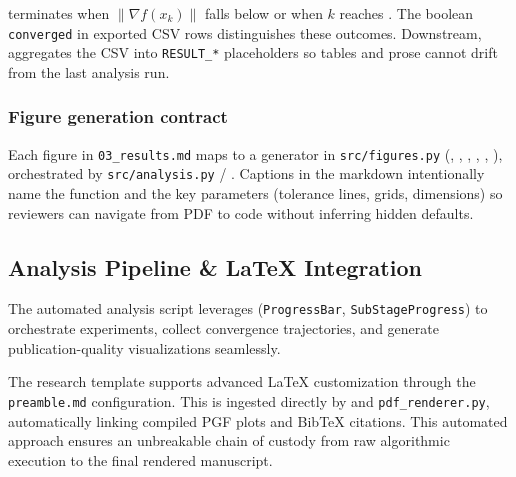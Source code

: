 \documentclass[
]{article}
\begin{document}
 terminates when \(\|\nabla f(x_k)\|\) falls
below  or when \(k\) reaches
. The boolean \texttt{converged} in
exported CSV rows distinguishes these outcomes. Downstream,
 aggregates the
CSV into \texttt{RESULT\_*} placeholders so tables and prose cannot
drift from the last analysis run.

\subsubsection{Figure generation
contract}\label{figure-generation-contract}

Each figure in \texttt{03\_results.md} maps to a generator in
\texttt{src/figures.py} (,
,
,
,
,
), orchestrated by
\texttt{src/analysis.py} / .
Captions in the markdown intentionally name the function and the key
parameters (tolerance lines, grids, dimensions) so reviewers can
navigate from PDF to code without inferring hidden defaults.

\subsection{Analysis Pipeline \& LaTeX
Integration}\label{analysis-pipeline-latex-integration}

The automated analysis script leverages
\href{https://github.com/docxology/template/blob/main/infrastructure/core/progress.py}{}
(\texttt{ProgressBar}, \texttt{SubStageProgress}) to orchestrate
experiments, collect convergence trajectories, and generate
publication-quality visualizations seamlessly.

The research template supports advanced LaTeX customization through the
\texttt{preamble.md} configuration. This is ingested directly by
 and
\texttt{pdf\_renderer.py}, automatically linking compiled PGF plots and
BibTeX citations. This automated approach ensures an unbreakable chain
of custody from raw algorithmic execution to the final rendered
manuscript.

\newpage
\end{document}
